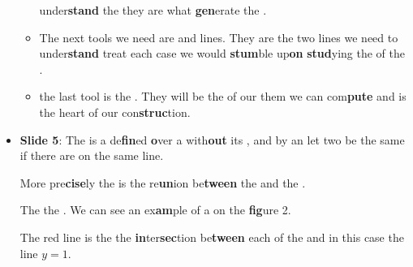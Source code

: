 \begin{itemize}
\begin{itemize}
                     under\textbf{stand} the  
                    they are what \textbf{gen}erate the .
                \item The next tools we need are  and
                     lines.
                    They are  the two lines  we need to under\textbf{stand}
                     treat
                    each case we would \textbf{stum}ble up\textbf{on} \textbf{stud}ying the  of the .
                \item {} the last tool is the .
                    They will be the  of our
                      them we can com\textbf{pute}
                     and 
                     is the heart of our con\textbf{struc}tion.
            \end{itemize}
        \item \textbf{Slide 5}: The  is a
             de\textbf{fin}ed \textbf{o}ver a
             with\textbf{out} its ,
            and by an
              let
            two  be the same if there are on the same
            line.

            More pre\textbf{cise}ly the  is the
            re\textbf{un}ion be\textbf{tween} the
            and the .

            The   the . We can see an ex\textbf{am}ple of a
             on the \textbf{fig}ure 2. 

            The red line is the    the \textbf{in}ter\textbf{sec}tion be\textbf{tween}
            each 
            of the  and in this case the line $y=1$.


\end{itemize}
